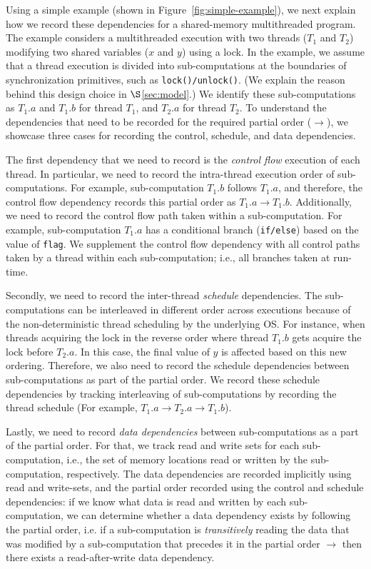 


 Using a simple example (shown in Figure~\ref{fig:simple-example}), we next explain how we record these dependencies for a shared-memory multithreaded program. The example considers a multithreaded execution with two threads ($T_1$ and $T_2$) modifying two shared variables ($x$ and $y$) using a lock. In the example, we assume that a thread execution is divided into sub-computations at the boundaries of synchronization primitives, such as {\tt lock()/unlock()}. (We explain the reason behind this design choice in $\S$\ref{sec:model}.) We identify these sub-computations as $T_1.a$ and $T_1.b$ for thread $T_1$, and $T_2.a$ for thread $T_2$.   To understand the dependencies that need to be recorded for the required partial order ($\rightarrow$), we showcase three cases for recording the control, schedule, and data dependencies.

The first dependency that we need to record is the {\em control flow} execution of each thread. In particular, we need to record the intra-thread execution order of sub-computations. For example, sub-computation $T_1.b$ follows $T_1.a$, and therefore, the control flow dependency records this partial order as $T_1.a \rightarrow T_1.b$. Additionally, we need to record the control flow path taken within a sub-computation. For example, sub-computation  $T_1.a$ has a conditional branch ({\tt if/else}) based on the value of {\tt flag}. We supplement the control flow dependency with all control paths taken by a thread within each sub-computation; i.e.,  all branches taken at run-time.

Secondly, we need to record the inter-thread {\em schedule} dependencies. The sub-computations can be interleaved in different order across executions because of the non-deterministic thread scheduling by the underlying OS. For instance, when threads acquiring the lock in the reverse order where thread $T_1.b$ gets acquire the lock before $T_2.a$. In this case, the final value of $y$ is affected based on this new ordering. Therefore, we also need to record the schedule dependencies between sub-computations as part of the partial order. We record these schedule dependencies by tracking interleaving of sub-computations by recording the thread schedule (For example, $T_1.a   \rightarrow   T_2.a \rightarrow T_1.b $).

Lastly,   we need to record {\em data dependencies} between sub-computations as a part of the partial order. For that, we track read and write sets for each sub-computation, i.e., the set of memory locations read or written by the sub-computation, respectively. The data dependencies are recorded implicitly using read and write-sets, and the partial order recorded using the control and schedule dependencies: if we know what data is read and written by each sub-computation, we can determine whether a data dependency exists by following the partial order, i.e. if a sub-computation is {\em transitively} reading the data that was modified by a sub-computation that precedes it in the partial order $\rightarrow$ then there exists a read-after-write data dependency. 

